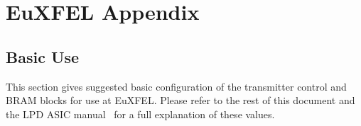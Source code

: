 \appendix
\chapter{EuXFEL Appendix} %
\label{cha:appendix}
\section{Basic Use} %
\label{app:basic_use}
    
This section gives suggested basic configuration of the transmitter control and BRAM blocks for use at EuXFEL. Please refer to the rest of this document and the LPD ASIC manual~\cite{LPD ASIC MANUAL ref} for a full explanation of these values.
    
